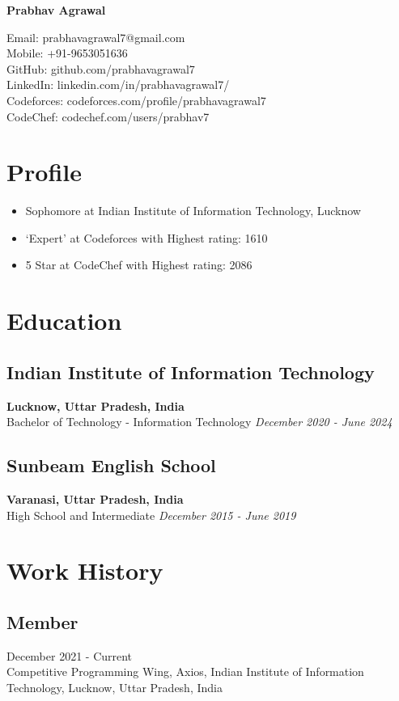 \documentclass[12pt]{article}
\newcommand{\resumename}[1]{\Huge\textbf{#1} \hfill \small}
\begin{document}
\noindent
\resumename{Prabhav Agrawal} \raggedright Email: prabhavagrawal7@gmail.com \\
\hfill Mobile: +91-9653051636 \\
GitHub: github.com/prabhavagrawal7           \\ 
LinkedIn: linkedin.com/in/prabhavagrawal7/    \\
Codeforces: codeforces.com/profile/prabhavagrawal7 \\ 
CodeChef: codechef.com/users/prabhav7 \\ 
\section*{Profile}
\begin{itemize}
    
    \item Sophomore at Indian Institute of Information Technology, Lucknow
    \item `Expert' at Codeforces with Highest rating: 1610
    \item 5 Star at CodeChef with Highest rating: 2086
\end{itemize}

\section*{Education}
\subsection*{Indian Institute of Information Technology}      \hfill \textbf{Lucknow, Uttar Pradesh, India} \\
Bachelor of Technology - Information Technology \hfill \textit{December 2020 - June 2024} \\
\subsection*{Sunbeam English School}                         \hfill \textbf{Varanasi, Uttar Pradesh, India} \\
High School and Intermediate                    \hfill \textit{December 2015 - June 2019} \\ 
\section*{Work History}
\subsection*{Member}                                          \hfill December 2021 - Current \\
Competitive Programming Wing, Axios, Indian Institute of Information Technology, Lucknow, Uttar Pradesh, India
\end{document}
